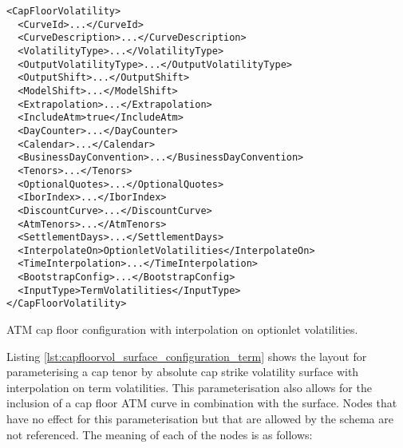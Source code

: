 \begin{longlisting}
\begin{verbatim}
<CapFloorVolatility>
  <CurveId>...</CurveId>
  <CurveDescription>...</CurveDescription>
  <VolatilityType>...</VolatilityType>
  <OutputVolatilityType>...</OutputVolatilityType>
  <OutputShift>...</OutputShift>
  <ModelShift>...</ModelShift>
  <Extrapolation>...</Extrapolation>
  <IncludeAtm>true</IncludeAtm>
  <DayCounter>...</DayCounter>
  <Calendar>...</Calendar>
  <BusinessDayConvention>...</BusinessDayConvention>
  <Tenors>...</Tenors>
  <OptionalQuotes>...</OptionalQuotes>
  <IborIndex>...</IborIndex>
  <DiscountCurve>...</DiscountCurve>
  <AtmTenors>...</AtmTenors>
  <SettlementDays>...</SettlementDays>
  <InterpolateOn>OptionletVolatilities</InterpolateOn>
  <TimeInterpolation>...</TimeInterpolation>
  <BootstrapConfig>...</BootstrapConfig>
  <InputType>TermVolatilities</InputType>
</CapFloorVolatility>
\end{verbatim}
\caption{ATM cap floor configuration with interpolation on optionlet volatilities.}
\label{lst:capfloorvol_atm_configuration_opt}
\end{longlisting}

Listing \ref{lst:capfloorvol_surface_configuration_term} shows the layout for parameterising a cap tenor by absolute cap strike volatility surface with interpolation on term volatilities. This parameterisation also allows for the inclusion of a cap floor ATM curve in combination with the surface. Nodes that have no effect for this parameterisation but that are allowed by the schema are not referenced. The meaning of each of the nodes is as follows:

